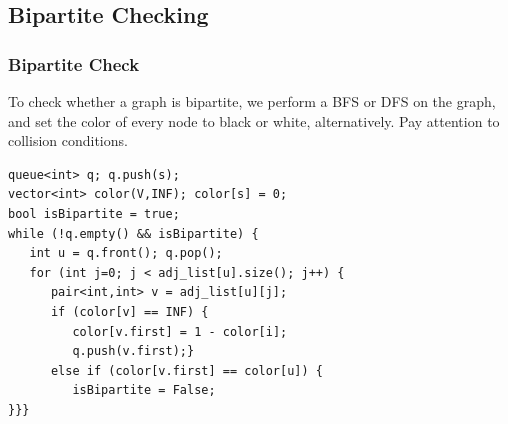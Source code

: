 \documentclass{beamer}
\begin{document}
\subsection{Bipartite Checking}

\begin{frame}[fragile]
  \frametitle{Bipartite Check}
  {\smaller
  To check whether a graph is bipartite, we perform a BFS or DFS on the graph, 
  and set the color of every node to black or white, alternatively. Pay 
  attention to collision conditions.

  \begin{exampleblock}{}
\begin{verbatim}
queue<int> q; q.push(s);
vector<int> color(V,INF); color[s] = 0;
bool isBipartite = true;
while (!q.empty() && isBipartite) {
   int u = q.front(); q.pop();
   for (int j=0; j < adj_list[u].size(); j++) {
      pair<int,int> v = adj_list[u][j];
      if (color[v] == INF) {
         color[v.first] = 1 - color[i];
         q.push(v.first);}
      else if (color[v.first] == color[u]) {
         isBipartite = False; 
}}}
\end{verbatim}
  \end{exampleblock}
  }
\end{frame}
\end{document}
